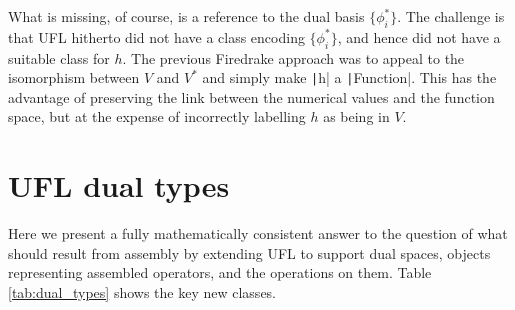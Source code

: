 \documentclass[a4paper,11pt]{article}
\begin{document}
What is missing, of course, is a reference to the dual basis $\{\phi^*_i\}$. The challenge is that UFL hitherto did not have a class encoding $\{\phi^*_i\}$, and hence did not have a suitable class for $h$. The previous Firedrake approach was to appeal to the isomorphism between $V$ and $V^*$ and simply make \texttt|h| a \texttt|Function|. This has the advantage of preserving the link between the numerical values and the function space, but at the expense of incorrectly labelling $h$ as being in $V$. 



\section{UFL dual types}

Here we present a fully mathematically consistent answer to the question of what should result from assembly by extending UFL to support dual spaces, objects representing assembled operators, and the operations on them. Table \ref{tab:dual_types} shows the key new classes. 
\end{document}
